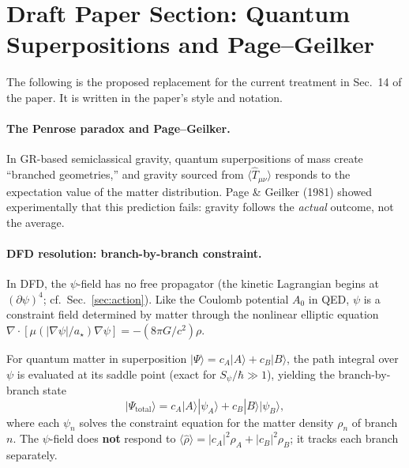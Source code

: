 \documentclass[11pt,a4paper]{article}
\begin{document}
\section{Draft Paper Section: Quantum Superpositions and Page--Geilker}
\label{sec:draft}

The following is the proposed replacement for the current treatment in
Sec.~14 of the paper. It is written in the paper's style and notation.

\begin{tcolorbox}[colback=blue!5, colframe=blue!50!black,
title=Proposed Replacement Text for Section 14.1]
\small

\paragraph{The Penrose paradox and Page--Geilker.}
In GR-based semiclassical gravity, quantum superpositions of mass create
``branched geometries,'' and gravity sourced from $\langle\hat{T}_{\mu\nu}\rangle$
responds to the expectation value of the matter distribution. Page \&
Geilker (1981) showed experimentally that this prediction fails:
gravity follows the \emph{actual} outcome, not the average.

\paragraph{DFD resolution: branch-by-branch constraint.}
In DFD, the $\psi$-field has no free propagator (the kinetic Lagrangian
begins at $(\partial\psi)^4$; cf.\ Sec.~\ref{sec:action}). Like the
Coulomb potential $A_0$ in QED, $\psi$ is a constraint field determined
by matter through the nonlinear elliptic equation
$\nabla\cdot[\mu(|\nabla\psi|/a_\star)\nabla\psi] = -(8\pi G/c^2)\rho$.

For quantum matter in superposition
$|\Psi\rangle = c_A|A\rangle + c_B|B\rangle$, the path integral over
$\psi$ is evaluated at its saddle point (exact for $S_\psi/\hbar \gg 1$),
yielding the branch-by-branch state
\begin{equation}
|\Psi_\mathrm{total}\rangle = c_A|A\rangle|\psi_A\rangle
+ c_B|B\rangle|\psi_B\rangle,
\end{equation}
where each $\psi_n$ solves the constraint equation for the matter
density $\rho_n$ of branch $n$. The $\psi$-field does \textbf{not}
respond to $\langle\hat\rho\rangle = |c_A|^2\rho_A + |c_B|^2\rho_B$;
it tracks each branch separately.


\end{tcolorbox}
\end{document}
